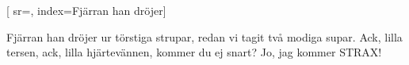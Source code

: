 [
		sr={},
		index={Fjärran han dröjer}]

\beginverse*						
Fjärran han dröjer ur törstiga strupar, 
redan vi tagit två modiga supar. 
Ack, lilla tersen, ack, lilla hjärtevännen, 
kommer du ej snart? Jo, jag kommer STRAX!
\endverse		
\endsong